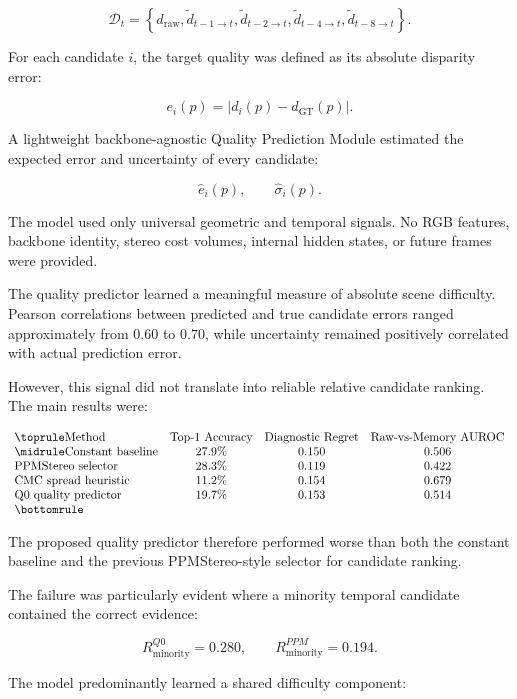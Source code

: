 \documentclass[11pt,a4paper]{article}
\begin{document}
\[
\mathcal{D}_t =
\left\{
d_{\mathrm{raw}},
\tilde d_{t-1\rightarrow t},
\tilde d_{t-2\rightarrow t},
\tilde d_{t-4\rightarrow t},
\tilde d_{t-8\rightarrow t}
\right\}.
\]

For each candidate \(i\), the target quality was defined as its absolute disparity error:

\[
e_i(p)=\left|d_i(p)-d_{\mathrm{GT}}(p)\right|.
\]

A lightweight backbone-agnostic Quality Prediction Module estimated the expected error and uncertainty of every candidate:

\[
\hat e_i(p), \qquad \hat{\sigma}_i(p).
\]

The model used only universal geometric and temporal signals. No RGB features, backbone identity, stereo cost volumes, internal hidden states, or future frames were provided.

The quality predictor learned a meaningful measure of absolute scene difficulty. Pearson correlations between predicted and true candidate errors ranged approximately from \(0.60\) to \(0.70\), while uncertainty remained positively correlated with actual prediction error.

However, this signal did not translate into reliable relative candidate ranking. The main results were:

\[
\begin{array}{lccc}
\toprule
\text{Method} &
\text{Top-1 Accuracy} &
\text{Diagnostic Regret} &
\text{Raw-vs-Memory AUROC} \\
\midrule
\text{Constant baseline} & 27.9\% & 0.150 & 0.506 \\
\text{PPMStereo selector} & 28.3\% & 0.119 & 0.422 \\
\text{CMC spread heuristic} & 11.2\% & 0.154 & 0.679 \\
\text{Q0 quality predictor} & 19.7\% & 0.153 & 0.514 \\
\bottomrule
\end{array}
\]

The proposed quality predictor therefore performed worse than both the constant baseline and the previous PPMStereo-style selector for candidate ranking.

The failure was particularly evident where a minority temporal candidate contained the correct evidence:

\[
R_{\mathrm{minority}}^{Q0}=0.280,
\qquad
R_{\mathrm{minority}}^{PPM}=0.194.
\]

The model predominantly learned a shared difficulty component:
\end{document}
